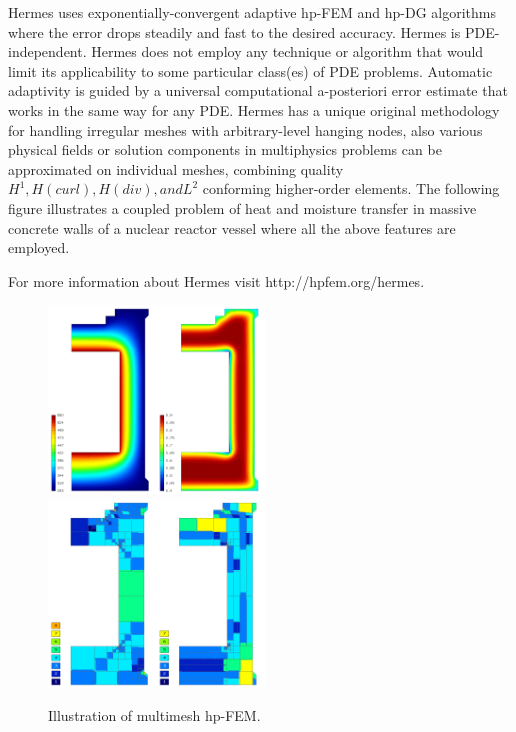 \documentclass[12pt]{elsarticle}
\begin{document}
Hermes uses exponentially-convergent adaptive hp-FEM and hp-DG algorithms where the error drops steadily and fast to the desired accuracy.
Hermes is PDE-independent. Hermes does not employ any technique or algorithm that would limit its applicability to some particular class(es) of PDE problems. Automatic adaptivity is guided by a universal computational a-posteriori error estimate that works in the same way for any PDE.
Hermes has a unique original methodology for handling irregular meshes with arbitrary-level hanging nodes, also various physical fields or solution components in multiphysics problems can be approximated on individual meshes, combining quality $H^1, H(curl), H(div), and L^2$ conforming higher-order elements. The following figure illustrates a coupled problem of heat and moisture transfer in massive concrete walls of a nuclear reactor vessel where all the above features are employed.

For more information about Hermes visit {http://hpfem.org/hermes}.

\begin{figure}[H]
\centering
\includegraphics[height=5cm]{img/hermes_hm_sol.png}
\hspace{10mm}
\includegraphics[height=5cm]{img/hermes_hm_mesh.png}
\caption{Illustration of multimesh hp-FEM.}
\label{fig:hermes_hm}
\end{figure}
\noindent






\end{document}
